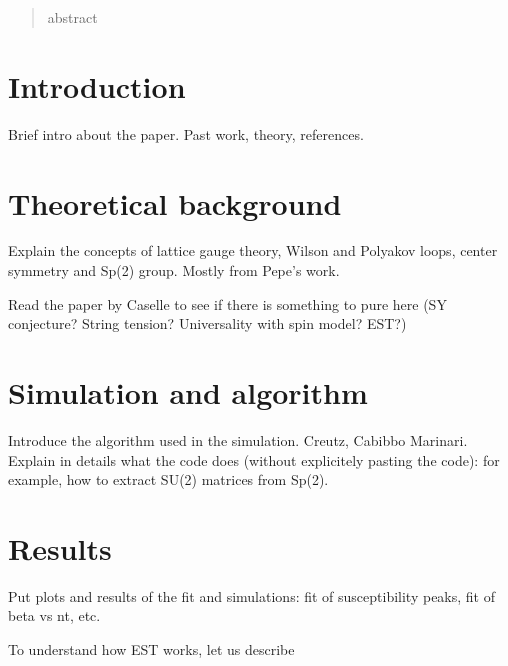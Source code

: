 \documentclass[reqno, 12pt]{article}
\title{}
\date{}
\author{}
\begin{document}
\begin{abstract}
	abstract
\end{abstract}

\section{Introduction}
Brief intro about the paper. Past work, theory, references.


\section{Theoretical background}
Explain the concepts of lattice gauge theory, Wilson and Polyakov loops, center symmetry and Sp(2) group. 
Mostly from Pepe's work.

Read the paper by Caselle to see if there is something to pure here (SY conjecture? String tension? 
Universality with spin model? EST?)

\section{Simulation and algorithm}
Introduce the algorithm used in the simulation. Creutz, Cabibbo Marinari. Explain in details what the code
does (without explicitely pasting the code): for example, how to extract SU(2) matrices from Sp(2).

\section{Results}
Put plots and results of the fit and simulations: fit of susceptibility peaks, fit of beta vs nt, etc.


To understand how EST works, let us describe 

\end{document}
